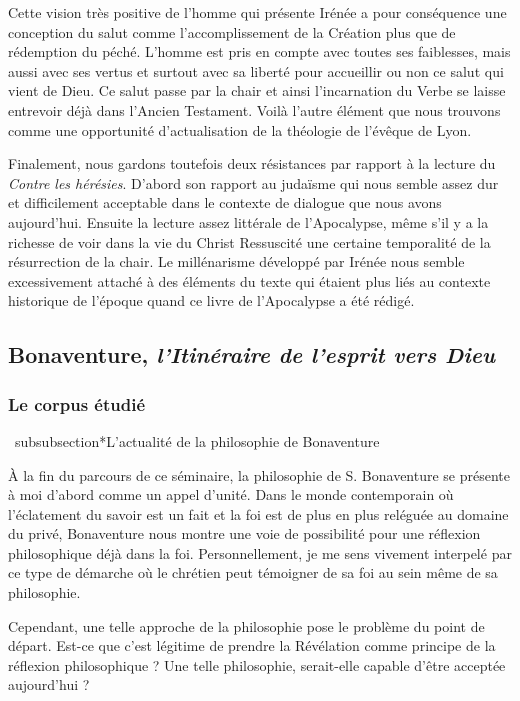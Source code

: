 Cette vision très positive de l'homme qui présente Irénée a pour conséquence une conception du salut comme l'accomplissement de la Création plus que de rédemption du péché. L'homme est pris en compte avec toutes ses faiblesses, mais aussi avec ses vertus et surtout avec sa liberté pour accueillir ou non ce salut qui vient de Dieu. Ce salut passe par la chair et ainsi l'incarnation du Verbe se laisse entrevoir déjà dans l'Ancien Testament. Voilà l'autre élément que nous trouvons comme une opportunité d'actualisation de la théologie de l'évêque de Lyon.  

Finalement, nous gardons toutefois deux résistances par rapport à la lecture du \emph{Contre les hérésies}. D'abord son rapport au judaïsme qui nous semble assez dur et difficilement acceptable dans le contexte de dialogue que nous avons aujourd'hui. Ensuite la lecture assez littérale de l'Apocalypse, même s'il y a la richesse de voir dans la vie du Christ Ressuscité une certaine temporalité de la résurrection de la chair. Le millénarisme développé par Irénée nous semble excessivement attaché à des éléments du texte qui étaient plus liés au contexte historique de l'époque quand ce livre de l'Apocalypse a été rédigé.


\subsection{Bonaventure, \emph{l’Itinéraire de l’esprit vers Dieu}}
\subsubsection*{Le corpus étudié}
{\footnotesize
}
\ subsubsection*{L'actualité de la philosophie de Bonaventure}

À la fin du parcours de ce séminaire, la philosophie de S. Bonaventure se présente à moi d'abord comme un appel d'unité. Dans le monde contemporain où l'éclatement du savoir est un fait et la foi est de plus en plus reléguée au domaine du privé, Bonaventure nous montre une voie de possibilité pour une réflexion philosophique déjà dans la foi. Personnellement, je me sens vivement interpelé par ce type de démarche où le chrétien peut témoigner de sa foi au sein même de sa philosophie.

Cependant, une telle approche de la philosophie pose le problème du point de départ. Est-ce que c'est légitime de prendre la Révélation comme principe de la réflexion philosophique ? Une telle philosophie, serait-elle capable d'être acceptée aujourd'hui ? 

